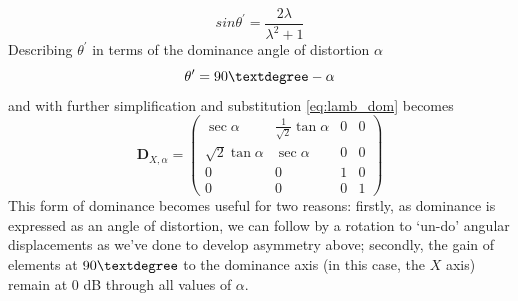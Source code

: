 \documentclass[12pt]{article}
\begin{document}
\begin{equation}		\label{eq:cott_5}
	sin\theta^\prime = \frac{2\lambda}{\lambda^2 +1}
\end{equation} Describing \(\theta^\prime\) in terms of the dominance angle of distortion \(\alpha\)
\begin{equation}
	\theta^\prime = 90\textdegree - \alpha
\end{equation} and with further simplification and substitution \eqref{eq:lamb_dom} becomes\begin{equation}	\label{eq:alpha_dom}
\mathbf{D}_{X, \alpha} = \begin{pmatrix}
	\sec{\alpha} & \frac{1}{\sqrt{2}}\tan{\alpha} & 0 & 0\\
	\sqrt{2}\tan{\alpha} & \sec{\alpha} & 0 & 0\\
	0 & 0 & 1 & 0\\
	0 & 0 & 0 & 1
\end{pmatrix}
\end{equation} This form of dominance becomes useful for two reasons: firstly, as dominance is expressed as an angle of distortion, we can follow by a rotation to `un-do' angular displacements as we've done to develop asymmetry above; secondly, the gain of elements at \(90\textdegree\) to the dominance axis (in this case, the \(X\) axis) remain at \(0\) dB through all values of \(\alpha\).
\end{document}
